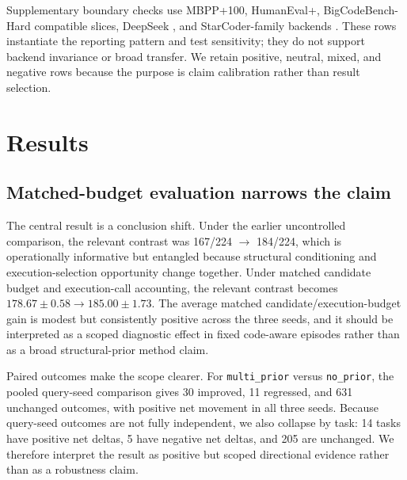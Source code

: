 \documentclass{article}
\begin{document}
Supplementary boundary checks use MBPP+100, HumanEval+, BigCodeBench-Hard compatible slices, DeepSeek \citep{guo2024deepseekcoder}, and StarCoder-family backends \citep{li2023starcoder}. These rows instantiate the reporting pattern and test sensitivity; they do not support backend invariance or broad transfer. We retain positive, neutral, mixed, and negative rows because the purpose is claim calibration rather than result selection.

\section{Results}
\subsection{Matched-budget evaluation narrows the claim}
The central result is a conclusion shift. Under the earlier uncontrolled comparison, the relevant contrast was 167/224 $\to$ 184/224, which is operationally informative but entangled because structural conditioning and execution-selection opportunity change together. Under matched candidate budget and execution-call accounting, the relevant contrast becomes $178.67 \pm 0.58 \to 185.00 \pm 1.73$. The average matched candidate/execution-budget gain is modest but consistently positive across the three seeds, and it should be interpreted as a scoped diagnostic effect in fixed code-aware episodes rather than as a broad structural-prior method claim.

Paired outcomes make the scope clearer. For \texttt{multi\_prior} versus \texttt{no\_prior}, the pooled query-seed comparison gives 30 improved, 11 regressed, and 631 unchanged outcomes, with positive net movement in all three seeds. Because query-seed outcomes are not fully independent, we also collapse by task: 14 tasks have positive net deltas, 5 have negative net deltas, and 205 are unchanged. We therefore interpret the result as positive but scoped directional evidence rather than as a robustness claim.
\end{document}
